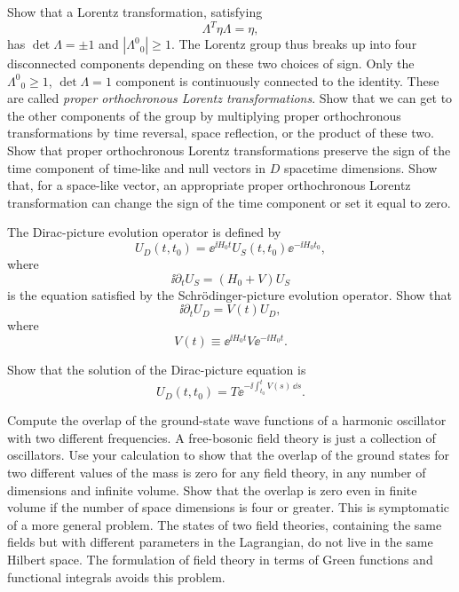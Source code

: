 \begin{banksproblems}

Show that a Lorentz transformation, satisfying
\[
  \Lambda^{T}\eta\Lambda=\eta,
\]
has $\det\Lambda=\pm1$ and $|\Lambda^{0}{}_{0}|\geq 1$. The Lorentz group thus breaks up into four disconnected components depending on these two choices of sign. Only the $\Lambda^{0}{}_{0}\geq 1$, $\det\Lambda=1$ component is continuously connected to the identity. These are called \emph{proper orthochronous Lorentz transformations}. Show that we can get to the other components of the group by multiplying proper orthochronous transformations by time reversal, space reflection, or the product of these two. Show that proper orthochronous Lorentz transformations preserve the sign of the time component of time-like and null vectors in $D$ spacetime dimensions. Show that, for a space-like vector, an appropriate proper orthochronous Lorentz transformation can change the sign of the time component or set it equal to zero.

The Dirac-picture evolution operator is defined by
\[
  U_{D}(t,t_{0})=\ee^{\ii H_{0}t}U_{S}(t,t_{0})\ee^{-\ii H_{0}t_{0}},
\]
where
\[
  \ii\partial_{t}U_{S}=(H_{0}+V)U_{S}
\]
is the equation satisfied by the Schrödinger-picture evolution operator. Show that
\[
  \ii\partial_{t}U_{D}=V(t)U_{D},
\]
where
\[
  V(t)\equiv\ee^{\ii H_{0}t}V\ee^{-\ii H_{0}t}.
\]

Show that the solution of the Dirac-picture equation is
\[
  U_{D}(t,t_{0})=T\ee^{-\ii\int_{t_{0}}^{t}V(s)\,\dd s}.
\]

Compute the overlap of the ground-state wave functions of a harmonic oscillator with two different frequencies. A free-bosonic field theory is just a collection of oscillators. Use your calculation to show that the overlap of the ground states for two different values of the mass is zero for any field theory, in any number of dimensions and infinite volume. Show that the overlap is zero even in finite volume if the number of space dimensions is four or greater. This is symptomatic of a more general problem. The states of two field theories, containing the same fields but with different parameters in the Lagrangian, do not live in the same Hilbert space. The formulation of field theory in terms of Green functions and functional integrals avoids this problem.


\end{banksproblems}
